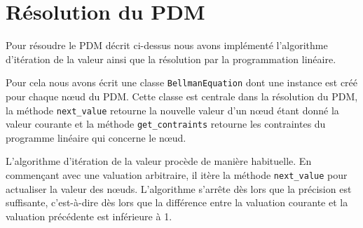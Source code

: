 \documentclass[a4paper]{article}
\theoremstyle{plain}
\begin{document}
\section{Résolution du PDM}

Pour résoudre le PDM décrit ci-dessus nous avons implémenté l'algorithme d'itération de la valeur ainsi que la résolution par la programmation linéaire. 

Pour cela nous avons écrit une classe \texttt{BellmanEquation} dont une instance est créé pour chaque n\oe ud du PDM. Cette classe est centrale dans la résolution du PDM, la méthode \texttt{next\_value} retourne la nouvelle valeur d'un n\oe ud étant donné la valeur courante et la méthode \texttt{get\_contraints} retourne les contraintes du programme linéaire qui concerne le n\oe ud.

L'algorithme d'itération de la valeur procède de manière habituelle. En commençant avec une valuation arbitraire, il itère la méthode \texttt{next\_value} pour actualiser la valeur des n\oe uds. L'algorithme s'arrête dès lors que la précision est suffisante, c'est-à-dire dès lors que la différence entre la valuation courante et la valuation précédente est inférieure à 1.
\end{document}
